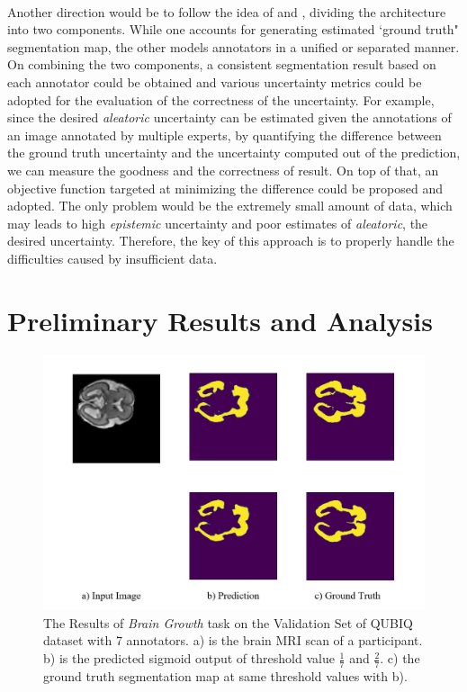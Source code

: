 \documentclass[12pt]{extarticle}
\begin{document}
\paragraph{}
Another direction would be to follow the idea of 
\cite{zhang2020disentangling} and \cite{kohl2019probabilistic}, 
dividing the architecture into two components. 
While one accounts for generating estimated `ground truth" segmentation map,
the other models annotators in a unified or separated manner. On combining 
the two components, a consistent segmentation result based on each annotator 
could be obtained and various uncertainty metrics could be adopted for
the evaluation of the correctness of the uncertainty. For example,
since the desired \textit{aleatoric} uncertainty can be 
estimated given the annotations of an image annotated by multiple experts\cite{qubiq}, 
by quantifying the difference between the ground truth uncertainty and 
the uncertainty computed out of the prediction, we can measure the goodness and the correctness of
result. On top of that, an objective function targeted at 
minimizing the difference could be proposed and adopted. The only problem would be the 
extremely small amount of data, which may leads to high \textit{epistemic} uncertainty and 
poor estimates of \textit{aleatoric}, the desired uncertainty. Therefore, the key of this approach 
is to properly handle the difficulties caused by insufficient data.

\section{Preliminary Results and Analysis}
\begin{figure}[ht!]
\centering
\includegraphics[scale=0.28]{fig1.jpg}
\caption{The Results of \textit{Brain Growth} task on the Validation Set of 
QUBIQ dataset with 7 annotators. a) is the brain 
MRI scan of a participant. b) is the predicted sigmoid output of threshold 
value $\frac{1}{7}$ and $\frac{2}{7}$. c) the 
ground truth segmentation map at same threshold values with b).}
\label{pre_results}
\end{figure}
\end{document}
